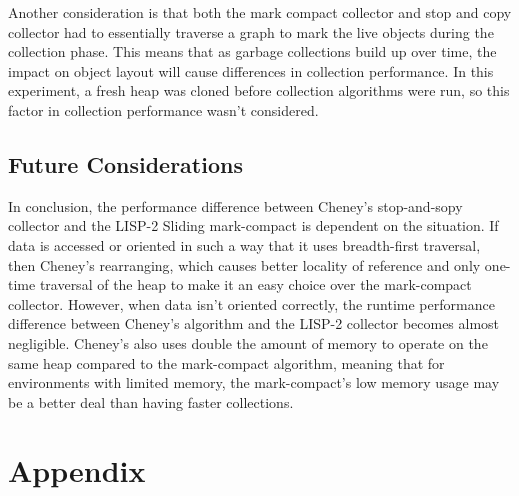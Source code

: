 \documentclass[index]{subfiles}
\begin{document}
Another consideration is that both the mark compact collector and stop and copy collector had to essentially traverse a graph to mark the live objects during the collection phase. This means that as garbage collections build up over time, the impact on object layout will cause differences in collection performance. In this experiment, a fresh heap was cloned before collection algorithms were run, so this factor in collection performance wasn't considered.

\subsection{Future Considerations}

In conclusion, the performance difference between Cheney's stop-and-sopy collector and the LISP-2 Sliding mark-compact is dependent on the situation. If data is accessed or oriented in such a way that it uses breadth-first traversal, then Cheney's rearranging, which causes better locality of reference and only one-time traversal of the heap to make it an easy choice over the mark-compact collector. However, when data isn't oriented correctly, the runtime performance difference between Cheney's algorithm and the LISP-2 collector becomes almost negligible. Cheney's also uses double the amount of memory to operate on the same heap compared to the mark-compact algorithm, meaning that for environments with limited memory, the mark-compact's low memory usage may be a better deal than having faster collections.

\newpage

\raggedright{}
\printbibliography[heading=bibintoc, title={Works Cited}]

\section{Appendix}
\appendix
\renewcommand{\thesubsection}{\Alph{subsection}}
\end{document}
